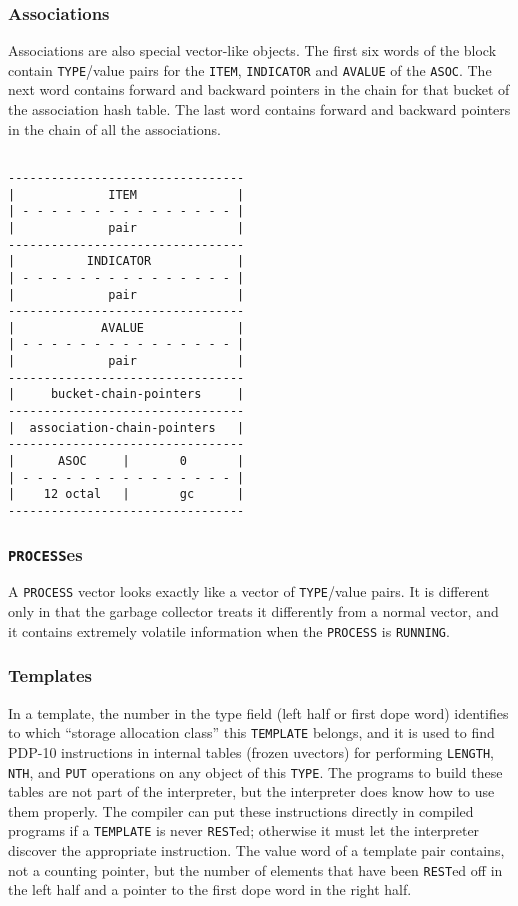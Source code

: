 \documentclass[a4paper]{scrbook}
\begin{document}
\subsubsection*{Associations}\label{associations}

Associations are also special vector-like objects. The first six words of the block contain \texttt{TYPE}/value pairs for
the \texttt{ITEM}, \texttt{INDICATOR} and \texttt{AVALUE} of the \texttt{ASOC}. The next word contains forward and backward
pointers in the chain for that bucket of the association hash table. The last word contains forward and backward pointers
in the chain of all the associations.

\begin{verbatim}

---------------------------------
|             ITEM              |
| - - - - - - - - - - - - - - - |
|             pair              |
---------------------------------
|          INDICATOR            |
| - - - - - - - - - - - - - - - |
|             pair              |
---------------------------------
|            AVALUE             |
| - - - - - - - - - - - - - - - |
|             pair              |
---------------------------------
|     bucket-chain-pointers     |
---------------------------------
|  association-chain-pointers   |
---------------------------------
|      ASOC     |       0       |
| - - - - - - - - - - - - - - - |
|    12 octal   |       gc      |
---------------------------------
\end{verbatim}

\subsubsection*{\texorpdfstring{\texttt{PROCESS}es}{PROCESSes}}\label{processes}

A \texttt{PROCESS} vector looks exactly like a vector of \texttt{TYPE}/value pairs. It is different only in that the
garbage collector treats it differently from a normal vector, and it contains extremely volatile information when the
\texttt{PROCESS} is \texttt{RUNNING}.

\subsubsection*{Templates}\label{templates}

In a template, the number in the type field (left half or first dope word) identifies to which ``storage allocation class''
this \texttt{TEMPLATE} belongs, and it is used to find PDP-10 instructions in internal tables (frozen uvectors) for
performing \texttt{LENGTH}, \texttt{NTH}, and \texttt{PUT} operations on any object of this \texttt{TYPE}. The programs to
build these tables are not part of the interpreter, but the interpreter does know how to use them properly. The compiler
can put these instructions directly in compiled programs if a \texttt{TEMPLATE} is never \texttt{REST}ed; otherwise it must
let the interpreter discover the appropriate instruction. The value word of a template pair contains, not a counting
pointer, but the number of elements that have been \texttt{REST}ed off in the left half and a pointer to the first dope
word in the right half.
\end{document}
